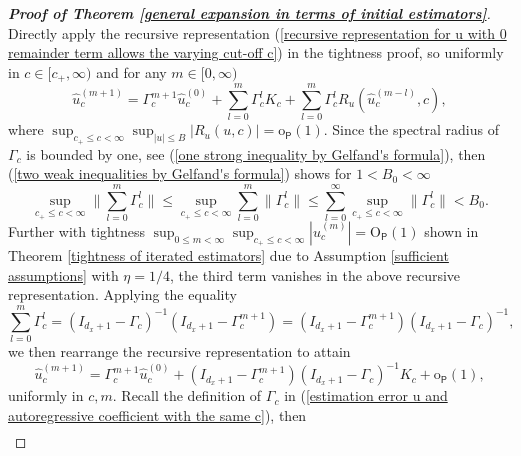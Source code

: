 \documentclass[11pt, letterpaper]{article}
\numberwithin{algorithm}{section}
\numberwithin{assumption}{section}
\numberwithin{lemma}{section}
\numberwithin{theorem}{section}
\numberwithin{corollary}{section}
\numberwithin{remark}{section}
\numberwithin{equation}{section}
\numberwithin{figure}{section}
\numberwithin{table}{section}
\begin{document}
\begin{proof}[\textnormal{\textbf{Proof of Theorem \ref{general expansion in terms of initial estimators}}}]
Directly apply the recursive representation (\ref{recursive representation for u with 0 remainder term allows the varying cut-off c}) in the tightness proof, so uniformly in $c \in [c_{+}, \infty)$ and for any $m \in [0, \infty)$
\begin{equation*}
\widehat{u}_{c}^{(m + 1)} = \Gamma_{c}^{m + 1} \widehat{u}_{c}^{(0)} + \sum_{l = 0}^{m} \Gamma_{c}^{l} K_{c} + \sum_{l = 0}^{m} \Gamma_{c}^{l} R_{u}(\widehat{u}_{c}^{(m - l)}, c),
\end{equation*}
where $\sup_{c_{+} \le c < \infty} \sup_{|u| \le B} |R_{u}(u, c)| = \mathrm{o}_{\mathsf{P}}(1)$. Since the spectral radius of $\Gamma_{c}$ is bounded by one, see (\ref{one strong inequality by Gelfand's formula}), then (\ref{two weak inequalities by Gelfand's formula}) shows for $1 < B_{0} < \infty$
\begin{equation*}
\sup_{c_{+} \le c < \infty} \| \sum_{l = 0}^{m} \Gamma_{c}^{l} \| \le \sup_{c_{+} \le c < \infty} \sum_{l = 0}^{m} \| \Gamma_{c}^{l} \| \le \sum_{l = 0}^{\infty} \sup_{c_{+} \le c < \infty} \| \Gamma_{c}^{l} \| < B_{0}.
\end{equation*}
Further with tightness $\sup_{0 \le m < \infty} \sup_{c_{+} \le c < \infty} |\widehat{u}_{c}^{(m)}| = \mathrm{O}_{\mathsf{P}}(1)$ shown in Theorem \ref{tightness of iterated estimators} due to Assumption \ref{sufficient assumptions} with $\eta = 1/4$, the third term vanishes in the above recursive representation. Applying the equality
\begin{equation} \label{finite sum of geometric matrix sequence}
\sum_{l = 0}^{m} \Gamma_{c}^{l} = (I_{d_{x} + 1} - \Gamma_{c})^{-1} (I_{d_{x} + 1} - \Gamma_{c}^{m+1}) = (I_{d_{x} + 1} - \Gamma_{c}^{m+1}) (I_{d_{x} + 1} - \Gamma_{c})^{-1},
\end{equation}
we then rearrange the recursive representation to attain
\begin{equation} \label{m+1 step stochastic expansion in terms of initial estimators, kernels, and small remainder terms}
\widehat{u}_{c}^{(m + 1)} = \Gamma_{c}^{m + 1} \widehat{u}_{c}^{(0)} + (I_{d_{x} + 1} - \Gamma_{c}^{m + 1}) (I_{d_{x} + 1} - \Gamma_{c})^{-1} K_{c} + \mathrm{o}_{\mathsf{P}}(1),
\end{equation}
uniformly in $c, m$. Recall the definition of $\Gamma_{c}$ in (\ref{estimation error u and autoregressive coefficient with the same c}), then
\begin{align*}

\end{align*}
\end{proof}
\end{document}
